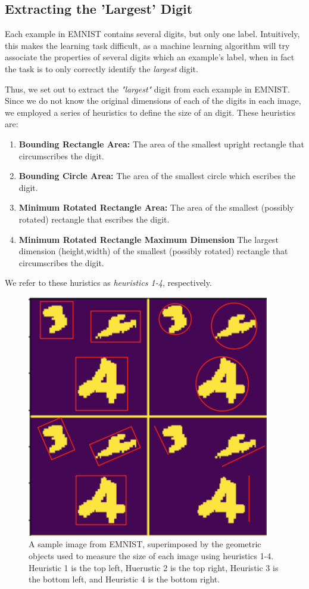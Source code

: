 \documentclass[letterpaper, 10 pt, conference]{ieeeconf}  %
\begin{document}
\subsection{Extracting the 'Largest' Digit} 

Each example in EMNIST contains several digits, but only one label. Intuitively, this makes the learning task difficult, as a machine learning algorithm will try associate the properties of several digits which an example's label, when in fact the task is to only correctly identify the \emph{largest} digit. 

Thus, we set out to extract the \emph{"largest"} digit from each example in EMNIST. Since we do not know the original dimensions of each of the digits in each image, we employed a series of heuristics to define the size of an digit. These heuristics are:
\begin{enumerate}
\item \textbf{Bounding Rectangle Area:} The area of the smallest upright rectangle that circumscribes the digit. 
\item \textbf{Bounding Circle Area:} The area of the smallest circle which escribes the digit. 
\item \textbf{Minimum Rotated Rectangle Area:} The area of the smallest (possibly rotated) rectangle that escribes the digit.
\item \textbf{Minimum Rotated Rectangle Maximum Dimension} The largest dimension (height,width) of the smallest (possibly rotated) rectangle that circumscribes the digit. 
\end{enumerate}
We refer to these huristics as \emph{heuristics 1-4}, respectively.

\begin{figure}[H]
      \centering
      \includegraphics[scale = 1]{size_definitions}
		\centering
      \caption{A sample image from EMNIST, superimposed by the geometric objects used to measure the size of each image using heuristics 1-4. Heuristic 1 is the top left, Huerustic 2 is the top right, Heuristic 3 is the bottom left, and Heuristic 4 is the bottom right.}
      \label{figurelabel}
   \end{figure}
\end{document}
